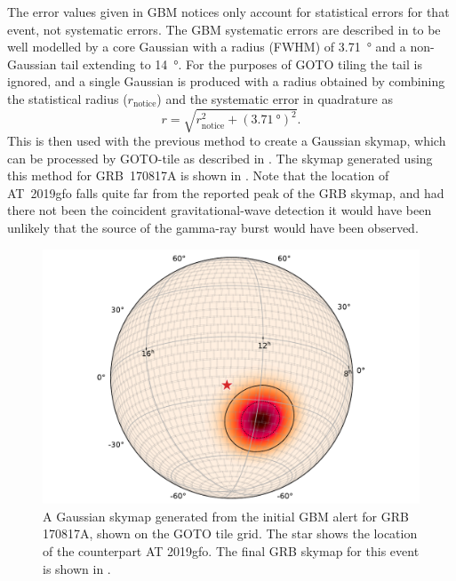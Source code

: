 \begin{colsection}
The error values given in GBM notices only account for statistical errors for that event, not systematic errors. The GBM systematic errors are described in \citet{Fermi_localisation} to be well modelled by a core Gaussian with a radius (FWHM) of \SI{3.71}{\degree} and a non-Gaussian tail extending to \SI{14}{\degree}. For the purposes of GOTO tiling the tail is ignored, and a single Gaussian is produced with a radius obtained by combining the statistical radius ($r_\text{notice}$) and the systematic error in quadrature as
%
\begin{equation}
    r = \sqrt{r_\text{notice}^2 + {(\SI{3.71}{\degree})}^2}.
    \label{eq:fermi_radius}
\end{equation}
%
This is then used with the previous method to create a Gaussian skymap, which can be processed by GOTO-tile as described in . The skymap generated using this method for GRB~170817A is shown in . Note that the location of AT~2019gfo falls quite far from the reported peak of the GRB skymap, and had there not been the coincident gravitational-wave detection it would have been unlikely that the source of the gamma-ray burst would have been observed.

\begin{figure}[t]
    \begin{center}
        \includegraphics[width=\linewidth]{images/tiling/170817_fermi.pdf}
    \end{center}
    \caption[Gaussian skymap for GRB 170817A]{
        A Gaussian skymap generated from the initial GBM alert for GRB 170817A, shown on the GOTO tile grid. The  star shows the location of the counterpart AT 2019gfo. The final GRB skymap for this event is shown in .
    }\label{fig:170817_grb}
\end{figure}


\end{colsection}
